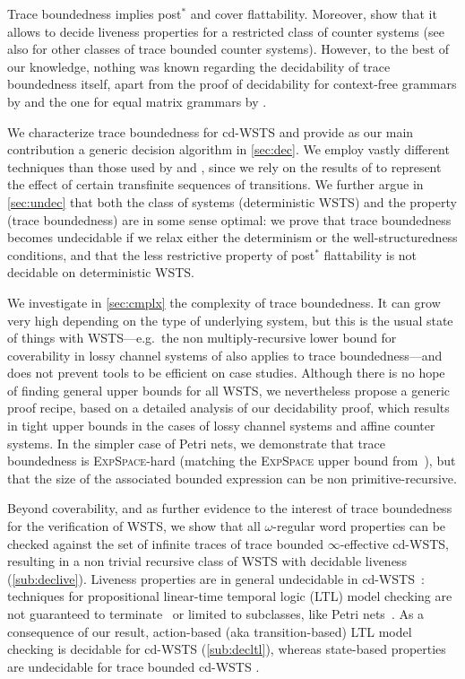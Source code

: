 \documentclass[11pt,reqno,a4paper]{amsart}
\renewcommand{\cite}{\citep}
\theoremstyle{plain}
\theoremstyle{definition}
\theoremstyle{remark}
\begin{document}
Trace boundedness implies post$^\ast$ and cover flattability.
Moreover, \citeauthor{foctlpr} show that it allows to decide liveness
properties for a restricted class of counter systems (see also
\cite{demri15,DBLP:conf/fct/GantyI15} for other classes of trace
bounded counter systems).  However, to the best of our knowledge,
nothing was known regarding the decidability of trace boundedness
itself, apart from the \citeyear{bcfl} proof of decidability for
context-free grammars by \citet{bcfl} and the \citeyear{emg} one for
equal matrix grammars by \citet{emg}.

We characterize trace boundedness for cd-WSTS and provide as our
main contribution a generic decision algorithm in \autoref{sec:dec}.
We employ vastly different techniques than those used by \citet{bcfl}
and \citet{emg}, since we rely on the results of \citet{cwsts1,cwsts2}
to represent the effect of certain transfinite sequences of
transitions.  We further argue in \autoref{sec:undec} that both the
class of systems (deterministic WSTS) and the property (trace boundedness)
are in some sense optimal: we prove that trace boundedness becomes
undecidable if we relax either the determinism or the
well-structuredness conditions, and that the less restrictive property
of post$^\ast$ flattability is not decidable on deterministic WSTS.

We investigate in \autoref{sec:cmplx} the complexity of trace
boundedness.  It can grow very high depending on the type of
underlying system, but this is the usual state of things with
WSTS---e.g.\ the non multiply-recursive lower bound for coverability
in lossy channel systems of \citet{CS-lics08} also applies to trace
boundedness---and does not prevent tools to be efficient on case
studies.  Although there is no hope of finding general upper bounds
for all WSTS, we nevertheless propose a generic proof recipe, based on
a detailed analysis of our decidability proof, which results in tight
upper bounds in the cases of lossy channel systems and affine counter
systems.  In the simpler case of Petri nets, we demonstrate that trace
boundedness is \textsc{ExpSpace}-hard (matching the \textsc{ExpSpace}
upper bound from~\citep{Schmitz11}), but that the size of the
associated bounded expression can be non primitive-recursive.

Beyond coverability, and as further evidence to the interest of trace
boundedness for the verification of WSTS, we show that all
$\omega$-regular word properties can be checked against the set of
infinite traces of trace bounded $\infty$-effective cd-WSTS, resulting
in a non trivial recursive class of WSTS with decidable liveness
(\autoref{sub:declive}).  Liveness properties are in general
undecidable in cd-WSTS~\citep{undecLCS,lrpn}: techniques for
propositional linear-time temporal logic (LTL) model checking are not
guaranteed to terminate~\citep{emerson,fwlcs} or limited to
subclasses, like Petri nets~\citep{ltlpn}.  As a consequence of our result, action-based
(aka transition-based) LTL model checking is decidable for cd-WSTS
(\autoref{sub:decltl}), whereas state-based properties are
undecidable for trace bounded cd-WSTS \citep{racs}.
 
\end{document}
